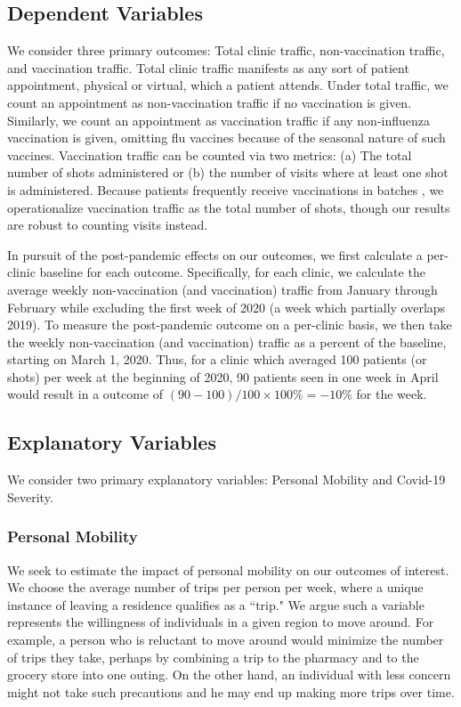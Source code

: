 \subsection{Dependent Variables} \label{dv}
 We consider three primary outcomes: Total clinic traffic, non-vaccination traffic, and vaccination traffic. Total clinic traffic manifests as any sort of patient appointment, physical or virtual, which a patient attends. Under total traffic, we count an appointment as non-vaccination traffic if no vaccination is given. Similarly, we count an appointment as vaccination traffic if any non-influenza vaccination is given, omitting flu vaccines because of the seasonal nature of such vaccines. Vaccination traffic can be counted via two metrics: (a) The total number of shots administered or (b) the number of visits where at least one shot is administered. Because patients frequently receive vaccinations in batches \citep{CDC_recVacc}, we operationalize vaccination traffic as the total number of shots, though our results are robust to counting visits instead.
 
 In pursuit of the post-pandemic effects on our outcomes, we first calculate a per-clinic baseline for each outcome. Specifically, for each clinic, we calculate the average weekly non-vaccination (and vaccination) traffic from January through February while excluding the first week of 2020 (a week which partially overlaps 2019). To measure the post-pandemic outcome on a per-clinic basis, we then take the weekly non-vaccination (and vaccination) traffic as a percent of the baseline, starting on March 1, 2020. Thus, for a clinic which averaged 100 patients (or shots) per week at the beginning of 2020, 90 patients seen in one week in April would result in a outcome of $(90-100)/100\times100\% = -10\%$ for the week.

\subsection{Explanatory Variables}
 We consider two primary explanatory variables: Personal Mobility and Covid-19 Severity. 
 
 \subsubsection{Personal Mobility} 
 We seek to estimate the impact of personal mobility on our outcomes of interest. We choose the average number of trips per person per week, where a unique instance of leaving a residence qualifies as a “trip." We argue such a variable represents the willingness of individuals in a given region to move around. For example, a person who is reluctant to move around would minimize the number of trips they take, perhaps by combining a trip to the pharmacy and to the grocery store into one outing. On the other hand, an individual with less concern might not take such precautions and he may end up making more trips over time. 
 
